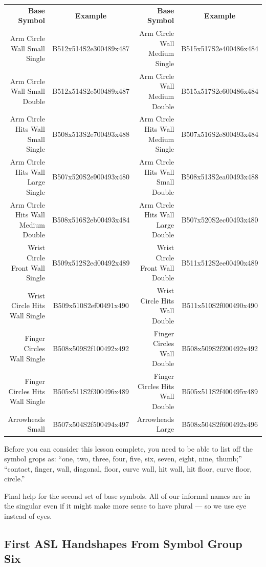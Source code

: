 \documentclass{article}
\begin{document}
\begin{center}
\begin{tabular}{rcrc}
\textbf{Base Symbol}&\textbf{Example}&\textbf{Base Symbol}&\textbf{Example}\\
Arm Circle Wall Small Single      &B512x514S2e300489x487&Arm Circle Wall Medium Single     &B515x517S2e400486x484\\
Arm Circle Wall Small Double      &B512x514S2e500489x487&Arm Circle Wall Medium Double     &B515x517S2e600486x484\\
Arm Circle Hits Wall Small Single &B508x513S2e700493x488&Arm Circle Hits Wall Medium Single&B507x516S2e800493x484\\
Arm Circle Hits Wall Large Single &B507x520S2e900493x480&Arm Circle Hits Wall Small Double &B508x513S2ea00493x488\\
Arm Circle Hits Wall Medium Double&B508x516S2eb00493x484&Arm Circle Hits Wall Large Double &B507x520S2ec00493x480\\
Wrist Circle Front Wall Single    &B509x512S2ed00492x489&Wrist Circle Front Wall Double    &B511x512S2ee00490x489\\
Wrist Circle Hits Wall Single     &B509x510S2ef00491x490&Wrist Circle Hits Wall Double     &B511x510S2f000490x490\\
Finger Circles Wall Single        &B508x509S2f100492x492&Finger Circles Wall Double        &B508x509S2f200492x492\\
Finger Circles Hits Wall Single   &B505x511S2f300496x489&Finger Circles Hits Wall Double   &B505x511S2f400495x489\\
Arrowheads Small                  &B507x504S2f500494x497&Arrowheads Large                  &B508x504S2f600492x496\\
\end{tabular}
\end{center}

Before you can consider this lesson complete, you need to be able to list off the symbol grops as:
``one, two, three, four, five, six, seven, eight, nine, thumb;''
``contact, finger, wall, diagonal, floor, curve wall, hit wall, hit floor, curve floor, circle.''

Final help for the second set of base symbols.
All of our informal names are in the singular even if it might make more sense to have plural --- so we use eye instead of eyes.

\subsection{First ASL Handshapes From Symbol Group Six}
\end{document}
